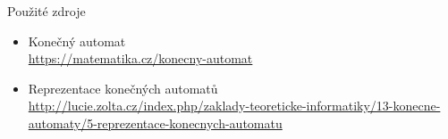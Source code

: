 \documentclass[hyperref={unicode}]{beamer}
\begin{document}
\begin{frame}[t]{Použité zdroje}
    \begin{itemize}
        \setlength\itemsep{1em}
        \item Konečný automat\\
        {\footnotesize \url{https://matematika.cz/konecny-automat}}
        \item Reprezentace konečných automatů\\
        {\footnotesize \url{http://lucie.zolta.cz/index.php/zaklady-teoreticke-informatiky/13-konecne-automaty/5-reprezentace-konecnych-automatu}}
    \end{itemize}
\end{frame}
\end{document}
